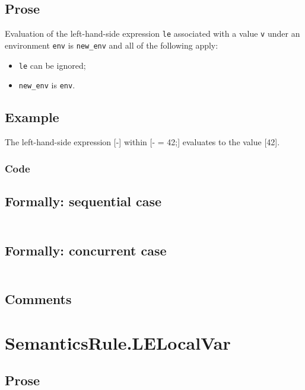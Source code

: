 \documentclass{book}
\begin{document}
    \subsection{Prose}
    Evaluation of the left-hand-side expression \texttt{le} associated with a
value \texttt{v} under an environment \texttt{env} is \texttt{new\_env} and all
of the following apply:
    \begin{itemize}
    \item \texttt{le} can be ignored;
    \item \texttt{new\_env} is \texttt{env}.
    \end{itemize}

  \subsection{Example}
  The left-hand-side expression [-] within [- = 42;] evaluates to the value [42].

  \subsubsection{Code}

  \subsection{Formally: sequential case}
  \begin{align}
  \end{align} 

  \subsection{Formally: concurrent case}
  \begin{align}
  \end{align} 

  \subsection{Comments}

\section{SemanticsRule.LELocalVar \label{sec:SemanticsRule.LELocalVar}}

    \subsection{Prose}
\end{document}
